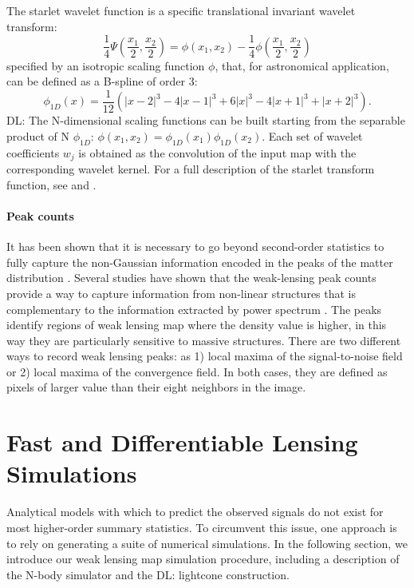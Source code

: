 \documentclass[twocolumn,twocolappendix]{aastex63}
\newcommand{\denise}[1]{{\color{red}DL: #1}}
\begin{document}
The starlet wavelet function is a specific translational invariant wavelet transform:
\begin{equation}
   \frac{1}{4} \Psi \left ( \frac{x_1}{2}, \frac{x_2}{2} \right )=
    \phi (x_1,x_2)- \frac{1}{4} \phi  \left ( \frac{x_1}{2},  \frac{x_2}{2} \right )
\end{equation}
specified by an isotropic scaling function $\phi$, that,  for astronomical application, can be defined as a B-spline of order 3:
\begin{equation}
\phi_{1D}(x)= \frac{1}{12} (|x-2|^3-4|x-1|^3+6|x|^3-4|x+1|^3+|x+2|^3 ).
\end{equation}
\denise{
The N-dimensional scaling functions can be built starting from the separable product of N $\phi_{1D}$: $\phi(x_1,x_2)=\phi_{1D}(x_1)\phi_{1D}(x_2)$. }
Each set of wavelet coefficients $w_j$ is obtained as the convolution of the input map with the corresponding wavelet kernel. For a full description of the starlet transform function, see \citet{4060954} and \citet{10.5555/1830428}.

\paragraph{Peak counts}It has been shown that it is necessary to go beyond second-order statistics to fully capture the non-Gaussian information encoded in the peaks of the matter distribution 
\citep{1997A&A...322....1B, 1997ApJ...484..560J,1999A&A...342...15V,2003A&A...397..809S}. Several studies have shown that the weak-lensing peak counts provide a way to capture information from non-linear structures that is complementary to the information extracted by power spectrum \citep{lin2015new, peel2017cosmological, ajani2020constraining, harnois2021cosmic, zurcher2022dark}.
The peaks identify regions of weak lensing map where the density value is higher, in this way they are particularly sensitive to massive structures.
There are two different ways to record weak lensing peaks: as 1) local maxima of the signal-to-noise field or 2) local maxima of the convergence field. In both cases, they are defined as pixels of larger value than their eight neighbors in the image.


\section{Fast and Differentiable Lensing Simulations}\label{Fast_and_Differentiable_Lensing_Simulations}
Analytical models with which to predict the observed signals do not exist for most higher-order summary statistics. 
To circumvent this issue, one approach is to rely on generating a suite of numerical simulations.
In the following section, we introduce our weak lensing map simulation procedure, including a description of the N-body simulator and the \denise{lightcone construction}.
\end{document}
